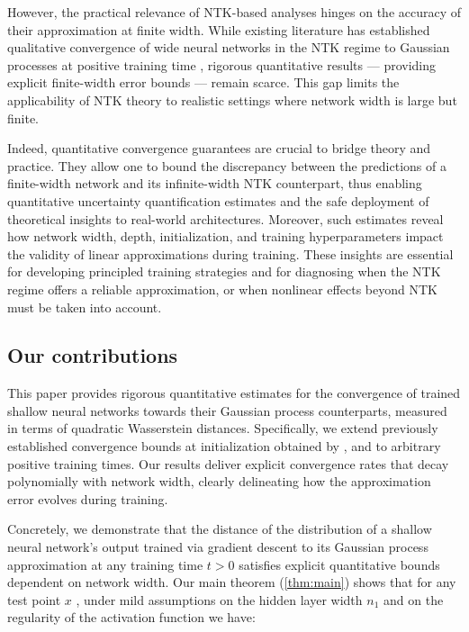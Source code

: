 \documentclass{article}
\theoremstyle{definition}
\theoremstyle{remark}
\numberwithin{equation}{section}
\begin{document}
However, the practical relevance of NTK-based analyses hinges on the accuracy of their approximation at finite width. 
While existing literature has established qualitative convergence of wide neural networks in the NTK regime to Gaussian processes at positive training time \cite{Lee2020}, 
rigorous quantitative results — providing explicit finite-width error bounds — remain scarce. 
This gap limits the applicability of NTK theory to realistic settings where network width is large but finite.

Indeed, quantitative convergence guarantees are crucial to bridge theory and practice. 
They allow one to bound the discrepancy between the predictions of a finite-width network and its infinite-width NTK counterpart, 
thus enabling quantitative uncertainty quantification estimates and the safe deployment of theoretical insights to real-world architectures. 
Moreover, such estimates reveal how network width, depth, initialization, and training hyperparameters impact the validity of linear approximations during training. 
These insights are essential for developing principled training strategies and for diagnosing when the NTK regime offers a reliable approximation, or when nonlinear effects beyond NTK must be taken into account.

\subsection{Our contributions}

This paper provides rigorous quantitative estimates for the convergence of trained shallow neural networks towards their Gaussian process counterparts, measured in terms of quadratic Wasserstein distances.
Specifically, we extend previously established convergence bounds at initialization obtained by \cite{BasteriTrevisan2023}, \cite{Favaro2025} and \cite{trevisan2023wide} to arbitrary positive training times. 
Our results deliver explicit convergence rates that decay polynomially with network width, clearly delineating how the approximation error evolves during training.

Concretely, we demonstrate that the distance of the distribution of a shallow neural network's output trained via gradient descent 
to its Gaussian process approximation at any training time $t > 0$ satisfies explicit quantitative bounds dependent on network width. 
Our main theorem (\ref{thm:main}) shows that for any test point $x$ , under mild assumptions on the hidden layer width $n_1$ and on the regularity of the activation function we have:
\end{document}
